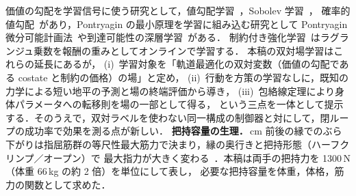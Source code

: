 価値の勾配を学習信号に使う研究として，値勾配学習~\cite{fairbank2012}，Sobolev 学習~\cite{czarnecki2017}，
確率的値勾配~\cite{heess2015}があり，Pontryagin の最小原理を学習に組み込む研究として
Pontryagin 微分可能計画法~\cite{jin2020}や到達可能性の深層学習~\cite{bansal2021}がある．
制約付き強化学習~\cite{achiam2017,tessler2019}はラグランジュ乗数を報酬の重みとしてオンラインで学習する．
本稿の双対場学習はこれらの延長にあるが，
(i)~学習対象を「軌道最適化の双対変数（価値の勾配である costate と制約の価格）の場」と定め，
(ii)~行動を方策の学習なしに，既知の力学による短い地平の予測と場の終端評価から導き，
(iii)~包絡線定理により身体パラメータへの転移則を場の一部として得る，
という三点を一体として提示する．そのうえで，双対ラベルを使わない同一構成の制御器と対にして，閉ループの成功率で効果を測る点が新しい．
\noindent\textbf{把持容量の生理．}\,cm 前後の縁でのぶら下がりは指屈筋群の等尺性最大筋力で決まり，縁の奥行きと把持形態（ハーフクリンプ／オープン）で
最大指力が大きく変わる~\cite{watts2004,amca2012}．本稿は両手の把持力を 1300\,N（体重 66\,kg の約 2 倍）を単位にして表し，
必要な把持容量を体重，体格，筋力の関数として求めた．
